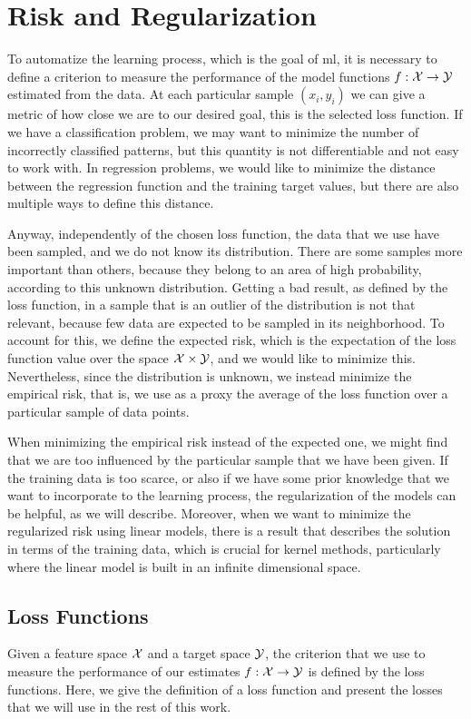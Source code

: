 \section{Risk and Regularization}
To automatize the learning process, which is the goal of \acrshort{ml}, it is necessary to define a criterion to measure the performance of the model functions $f: \mathcal{X} \to \mathcal{Y}$ estimated from the data.
At each particular sample $(x_i, y_i)$ we can give a metric of how close we are to our desired goal, this is the selected loss function. If we have a classification problem, we may want to minimize the number of incorrectly classified patterns, but this quantity is not differentiable and not easy to work with. In regression problems, we would like to minimize the distance between the regression function and the training target values, but there are also multiple ways to define this distance. 
%

Anyway, independently of the chosen loss function, the data that we use have been sampled, and we do not know its distribution. There are some samples more important than others, because they belong to an area of high probability, according to this unknown distribution. Getting a bad result, as defined by the loss function, in a sample that is an outlier of the distribution is not that relevant, because few data are expected to be sampled in its neighborhood. 
To account for this, we define the expected risk, which is the expectation of the loss function value over the space $\mathcal{X} \times \mathcal{Y}$, and we would like to minimize this. Nevertheless, since the distribution is unknown, we instead minimize the empirical risk, that is, we use as a proxy the average of the loss function over a particular sample of data points.

%
When minimizing the empirical risk instead of the expected one, we might find that we are too influenced by the particular sample that we have been given.  If the training data is too scarce, or also if we have some prior knowledge that we want to incorporate to the learning process, the regularization of the models can be helpful, as we will describe.
%
Moreover, when we want to minimize the regularized risk using linear models, there is a result that describes the solution in terms of the training data, which is crucial for kernel methods, particularly where the linear model is built in an infinite dimensional space.

\subsection{Loss Functions}
Given a feature space $\mathcal{X}$ and a target space $\mathcal{Y}$, the criterion that we use to measure the performance of our estimates $f: \mathcal{X} \to \mathcal{Y}$ is defined by the loss functions.
Here, we give the definition of a loss function and present the losses that we will use in the rest of this work.

